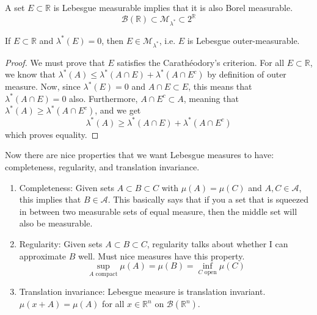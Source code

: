   \begin{theorem}
    A set $E \subset \mathbb{R}$ is Lebesgue measurable implies that it is also Borel measurable. 
    \begin{equation}
      \mathcal{B}(\mathbb{R}) \subset \mathcal{M}_{\lambda^*} \subset 2^\mathbb{R}
    \end{equation}
  \end{theorem}

  \begin{lemma}
    If $E \subset \mathbb{R}$ and $\lambda^*(E) = 0$, then $E \in \mathcal{M}_{\lambda^*}$, i.e. $E$ is Lebesgue outer-measurable. 
  \end{lemma}
  \begin{proof}
    We must prove that $E$ satisfies the Carathéodory's criterion. For all $E \subset \mathbb{R}$, we know that $\lambda^*(A) \leq \lambda^*(A \cap E) + \lambda^*(A \cap E^c)$ by definition of outer measure. Now, since $\lambda^* (E) =0$ and $A \cap E \subset E$, this means that $\lambda^* (A \cap E) = 0$ also. Furthermore, $A \cap E^c \subset A$, meaning that $\lambda^*(A) \geq \lambda^* (A \cap E^c)$, and we get 
    \begin{equation}
      \lambda^*(A) \geq \lambda^*(A \cap E) + \lambda^*(A \cap E^c)
    \end{equation}
    which proves equality. 
  \end{proof}

  Now there are nice properties that we want Lebesgue measures to have: completeness, regularity, and translation invariance. 
  \begin{enumerate}
    \item Completeness: Given sets $A \subset B \subset C$ with $\mu(A) = \mu(C)$ and $A, C \in \mathcal{A}$, this implies that $B \in \mathcal{A}$. This basically says that if you a set that is squeezed in between two measurable sets of equal measure, then the middle set will also be measurable. 
    \item Regularity: Given sets $A \subset B \subset C$, regularity talks about whether I can approximate $B$ well. Must nice measures have this property. 
      \begin{equation}
      \sup_{A \text{ compact}} \mu(A) = \mu(B) = \inf_{C \text{ open}} \mu(C)
      \end{equation}
    \item Translation invariance: Lebesgue measure is translation invariant. $\mu(x + A) = \mu(A)$ for all $x \in \mathbb{R}^n$ on $\mathcal{B}(\mathbb{R}^n)$. 
  \end{enumerate}

